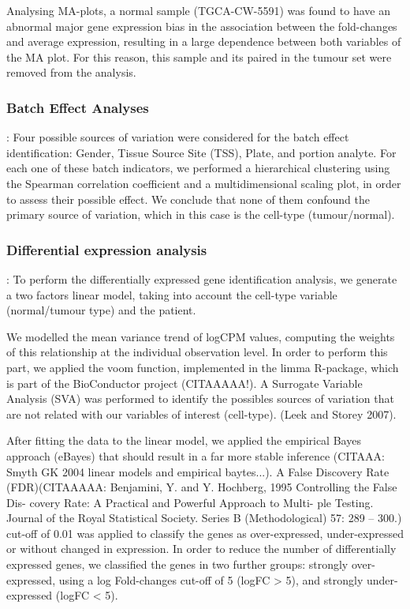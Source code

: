 \documentclass[9pt,twocolumn,twoside]{gsajnl}
\begin{document}
Analysing MA-plots, a normal sample (TGCA-CW-5591) was found to have an abnormal major gene expression bias in the association between the fold-changes and average expression, resulting in a large dependence between both variables of the MA plot. For this reason, this sample and its paired in the tumour set were removed from the analysis.


\subsubsection*{Batch Effect Analyses}
: Four possible sources of variation were considered for the batch effect identification: Gender, Tissue Source Site (TSS), Plate, and portion analyte. For each one of these batch indicators, we performed a hierarchical clustering using the Spearman correlation coefficient and a multidimensional scaling plot, in order to assess their possible effect. We conclude that none of them confound the primary source of variation, which in this case is the cell-type (tumour/normal).

\subsubsection*{Differential expression analysis	}
: To perform the differentially expressed gene identification analysis, we generate a two factors linear model, taking into account the cell-type variable (normal/tumour type) and the patient.

We modelled the mean variance trend of logCPM values, computing the weights of this relationship at the individual observation level. In order to perform this part, we applied the voom function, implemented in the limma R-package, which is part of the BioConductor project (CITAAAAA!). A Surrogate Variable Analysis (SVA) was performed to identify the possibles sources of variation that are not related with our variables of interest (cell-type). (Leek and Storey 2007).

After fitting the data to the linear model, we applied the 	empirical Bayes approach (eBayes) that should result in a far more stable inference (CITAAA: Smyth GK 2004 linear models and empirical baytes...). A False Discovery Rate (FDR)(CITAAAAA: Benjamini, Y. and Y. Hochberg, 1995 Controlling the False Dis- covery Rate: A Practical and Powerful Approach to Multi- ple Testing. Journal of the Royal Statistical Society. Series B (Methodological) 57: 289 – 300.) cut-off of 0.01 was applied to classify the genes as over-expressed, under-expressed or without changed in expression. In order to reduce the number of differentially expressed genes, we classified the genes in two further groups: strongly over-expressed, using a log Fold-changes cut-off of 5 (logFC > 5), and strongly under-expressed (logFC < 5). 
\end{document}
